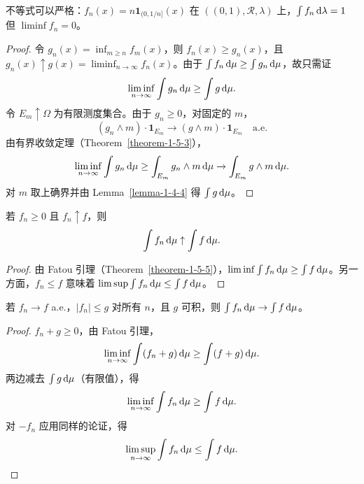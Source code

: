 \begin{example}
    不等式可以严格：$f_n(x) = n \mathbf{1}_{(0,1/n]}(x)$ 在 $((0,1), \mathcal{R}, \lambda)$ 上，$\int f_n \,\mathrm{d}\lambda = 1$ 但 $\liminf f_n = 0$。
\end{example}

\begin{proof}
    令 $g_n(x) = \inf_{m \ge n} f_m(x)$，则 $f_n(x) \ge g_n(x)$，且 $g_n(x) \uparrow g(x) = \liminf_{n \to \infty} f_n(x)$。由于 $\int f_n \,\mathrm{d}\mu \ge \int g_n \,\mathrm{d}\mu$，故只需证
    \[
        \liminf_{n \to \infty} \int g_n \,\mathrm{d}\mu \ge \int g \,\mathrm{d}\mu.
    \]
    令 $E_m \uparrow \Omega$ 为有限测度集合。由于 $g_n \ge 0$，对固定的 $m$，
    \[
        (g_n \wedge m) \cdot \mathbf{1}_{E_m} \to (g \wedge m) \cdot \mathbf{1}_{E_m} \quad \text{a.e.}
    \]
    由有界收敛定理（Theorem~\ref{theorem-1-5-3}），
    \[
        \liminf_{n \to \infty} \int g_n \,\mathrm{d}\mu \ge \int_{E_m} g_n \wedge m \,\mathrm{d}\mu \to \int_{E_m} g \wedge m \,\mathrm{d}\mu.
    \]
    对 $m$ 取上确界并由 Lemma~\ref{lemma-1-4-4} 得 $\int g \,\mathrm{d}\mu$。
\end{proof}

\begin{theorem}\label{theorem-1-5-7}
    若 $f_n \ge 0$ 且 $f_n \uparrow f$，则
    \[
        \int f_n \,\mathrm{d}\mu \uparrow \int f \,\mathrm{d}\mu.
    \]
\end{theorem}

\begin{proof}
    由 Fatou 引理（Theorem~\ref{theorem-1-5-5}），$\liminf \int f_n \,\mathrm{d}\mu \ge \int f \,\mathrm{d}\mu$。另一方面，$f_n \le f$ 意味着 $\limsup \int f_n \,\mathrm{d}\mu \le \int f \,\mathrm{d}\mu$。
\end{proof}

\begin{theorem}\label{theorem-1-5-8}
    若 $f_n \to f$ a.e.，$|f_n| \le g$ 对所有 $n$，且 $g$ 可积，则 $\int f_n \,\mathrm{d}\mu \to \int f \,\mathrm{d}\mu$。
\end{theorem}

\begin{proof}
    $f_n + g \ge 0$，由 Fatou 引理，
    \[
        \liminf_{n \to \infty} \int (f_n + g) \,\mathrm{d}\mu \ge \int (f+g) \,\mathrm{d}\mu.
    \]
    两边减去 $\int g \,\mathrm{d}\mu$（有限值），得
    \[
        \liminf_{n \to \infty} \int f_n \,\mathrm{d}\mu \ge \int f \,\mathrm{d}\mu.
    \]
    对 $-f_n$ 应用同样的论证，得
    \[
        \limsup_{n \to \infty} \int f_n \,\mathrm{d}\mu \le \int f \,\mathrm{d}\mu.
    \]
\end{proof}

